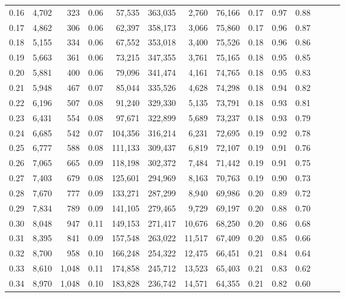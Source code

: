 \begin{tabular}{rrrrrrrrrrrrrr}
0.16 &  4,702 &    323 &  0.06 &   57,535 &  363,035 &   2,760 &  76,166 &  0.17 &  0.97 &      0.88 \\
0.17 &  4,862 &    306 &  0.06 &   62,397 &  358,173 &   3,066 &  75,860 &  0.17 &  0.96 &      0.87 \\
0.18 &  5,155 &    334 &  0.06 &   67,552 &  353,018 &   3,400 &  75,526 &  0.18 &  0.96 &      0.86 \\
0.19 &  5,663 &    361 &  0.06 &   73,215 &  347,355 &   3,761 &  75,165 &  0.18 &  0.95 &      0.85 \\
0.20 &  5,881 &    400 &  0.06 &   79,096 &  341,474 &   4,161 &  74,765 &  0.18 &  0.95 &      0.83 \\
0.21 &  5,948 &    467 &  0.07 &   85,044 &  335,526 &   4,628 &  74,298 &  0.18 &  0.94 &      0.82 \\
0.22 &  6,196 &    507 &  0.08 &   91,240 &  329,330 &   5,135 &  73,791 &  0.18 &  0.93 &      0.81 \\
0.23 &  6,431 &    554 &  0.08 &   97,671 &  322,899 &   5,689 &  73,237 &  0.18 &  0.93 &      0.79 \\
0.24 &  6,685 &    542 &  0.07 &  104,356 &  316,214 &   6,231 &  72,695 &  0.19 &  0.92 &      0.78 \\
0.25 &  6,777 &    588 &  0.08 &  111,133 &  309,437 &   6,819 &  72,107 &  0.19 &  0.91 &      0.76 \\
0.26 &  7,065 &    665 &  0.09 &  118,198 &  302,372 &   7,484 &  71,442 &  0.19 &  0.91 &      0.75 \\
0.27 &  7,403 &    679 &  0.08 &  125,601 &  294,969 &   8,163 &  70,763 &  0.19 &  0.90 &      0.73 \\
0.28 &  7,670 &    777 &  0.09 &  133,271 &  287,299 &   8,940 &  69,986 &  0.20 &  0.89 &      0.72 \\
0.29 &  7,834 &    789 &  0.09 &  141,105 &  279,465 &   9,729 &  69,197 &  0.20 &  0.88 &      0.70 \\
0.30 &  8,048 &    947 &  0.11 &  149,153 &  271,417 &  10,676 &  68,250 &  0.20 &  0.86 &      0.68 \\
0.31 &  8,395 &    841 &  0.09 &  157,548 &  263,022 &  11,517 &  67,409 &  0.20 &  0.85 &      0.66 \\
0.32 &  8,700 &    958 &  0.10 &  166,248 &  254,322 &  12,475 &  66,451 &  0.21 &  0.84 &      0.64 \\
0.33 &  8,610 &  1,048 &  0.11 &  174,858 &  245,712 &  13,523 &  65,403 &  0.21 &  0.83 &      0.62 \\
0.34 &  8,970 &  1,048 &  0.10 &  183,828 &  236,742 &  14,571 &  64,355 &  0.21 &  0.82 &      0.60 \\

\end{tabular}
